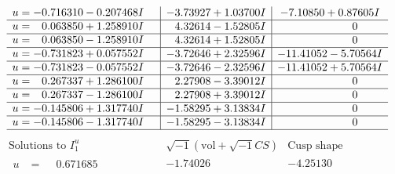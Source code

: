 \documentclass[1p]{elsarticle_modified}
\theoremstyle{definition}
\newcommand{\I}{\sqrt{-1}}
\begin{document}
$$\begin{array}{c|c|c}
\begin{aligned}
u &= -0.716310 - 0.207468 I\end{aligned}
 & -3.73927 + 1.03700 I & -7.10850 + 0.87605 I \\ \hline\begin{aligned}
u &= \phantom{-}0.063850 + 1.258910 I\end{aligned}
 & \phantom{-}4.32614 - 1.52805 I & \phantom{-0.000000 } 0 \\ \hline\begin{aligned}
u &= \phantom{-}0.063850 - 1.258910 I\end{aligned}
 & \phantom{-}4.32614 + 1.52805 I & \phantom{-0.000000 } 0 \\ \hline\begin{aligned}
u &= -0.731823 + 0.057552 I\end{aligned}
 & -3.72646 + 2.32596 I & -11.41052 - 5.70564 I \\ \hline\begin{aligned}
u &= -0.731823 - 0.057552 I\end{aligned}
 & -3.72646 - 2.32596 I & -11.41052 + 5.70564 I \\ \hline\begin{aligned}
u &= \phantom{-}0.267337 + 1.286100 I\end{aligned}
 & \phantom{-}2.27908 - 3.39012 I & \phantom{-0.000000 } 0 \\ \hline\begin{aligned}
u &= \phantom{-}0.267337 - 1.286100 I\end{aligned}
 & \phantom{-}2.27908 + 3.39012 I & \phantom{-0.000000 } 0 \\ \hline\begin{aligned}
u &= -0.145806 + 1.317740 I\end{aligned}
 & -1.58295 + 3.13834 I & \phantom{-0.000000 } 0 \\ \hline\begin{aligned}
u &= -0.145806 - 1.317740 I\end{aligned}
 & -1.58295 - 3.13834 I & \phantom{-0.000000 } 0\\
 \hline 
 \end{array}$$\newpage$$\begin{array}{c|c|c}  
\text{Solutions to }I^u_{1}& \I (\text{vol} + \sqrt{-1}CS) & \text{Cusp shape}\\
 \hline 
\begin{aligned}
u &= \phantom{-}0.671685\phantom{ +0.000000I}\end{aligned}
 & -1.74026\phantom{ +0.000000I} & -4.25130\phantom{ +0.000000I} \\ \hline\begin{aligned}

\end{aligned}
\end{array}$$
\end{document}
